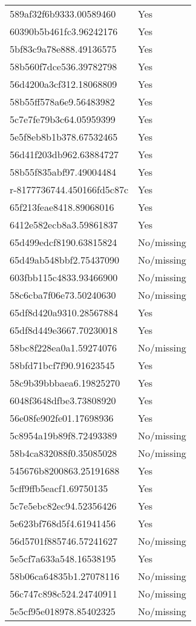 \begin{tabular}{ll}
589af32f6b9333.00589460 & Yes \\
60390b5b461fc3.96242176 & Yes \\
5bf83c9a78e888.49136575 & Yes \\
58b560f7dce536.39782798 & Yes \\
56d4200a3cf312.18068809 & Yes \\
58b55ff578a6e9.56483982 & Yes \\
5c7e7fe79b3c64.05959399 & Yes \\
5e5f8eb8b1b378.67532465 & Yes \\
56d41f203db962.63884727 & Yes \\
58b55f835abf97.49004484 & Yes \\
r-8177736744.450166fd5c87c & Yes \\
65f213feae8418.89068016 & Yes \\
6412e582ecb8a3.59861837 & Yes \\
65d499edcf8190.63815824 & No/missing \\
65d49ab548bbf2.75437090 & No/missing \\
603fbb115c4833.93466900 & No/missing \\
58c6cba7f06e73.50240630 & No/missing \\
65df8d420a9310.28567884 & Yes \\
65df8d449e3667.70230018 & Yes \\
58bc8f228ea0a1.59274076 & No/missing \\
58bfd71bcf7f90.91623545 & Yes \\
58c9b39bbbaea6.19825270 & Yes \\
6048f3648dfbe3.73808920 & Yes \\
56e08fe902fe01.17698936 & Yes \\
5c8954a19b89f8.72493389 & No/missing \\
58b4ca832088f0.35085028 & No/missing \\
545676b8200863.25191688 & Yes \\
5cff9ffb5eacf1.69750135 & Yes \\
5c7e5ebc82ec94.52356426 & Yes \\
5e623bf768d5f4.61941456 & Yes \\
56d5701f885746.57241627 & No/missing \\
5e5cf7a633a548.16538195 & Yes \\
58b06ca64835b1.27078116 & No/missing \\
56c747c898c524.24740911 & No/missing \\
5e5cf95e018978.85402325 & No/missing \\

\end{tabular}
